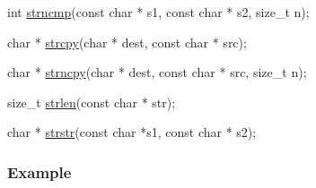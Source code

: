 \begin{DoxyCode}
\textcolor{keywordtype}{int} \mbox{\hyperlink{a00128_a07f4a84c11c106e95c32b6ab509346ef}{strncmp}}(\textcolor{keyword}{const} \textcolor{keywordtype}{char} * s1, \textcolor{keyword}{const} \textcolor{keywordtype}{char} * s2, \textcolor{keywordtype}{size\_t} n);

\textcolor{keywordtype}{char} * \mbox{\hyperlink{a00128_a7a82515b5d377be04817715c5465b647}{strcpy}}(\textcolor{keywordtype}{char} * dest, \textcolor{keyword}{const} \textcolor{keywordtype}{char} * src);

\textcolor{keywordtype}{char} * \mbox{\hyperlink{a00128_a47d54f24198df56da51078a6c540b9ed}{strncpy}}(\textcolor{keywordtype}{char} * dest, \textcolor{keyword}{const} \textcolor{keywordtype}{char} * src, \textcolor{keywordtype}{size\_t} n);

\textcolor{keywordtype}{size\_t} \mbox{\hyperlink{a00128_a008e171a518fe0e0352f31b245e03875}{strlen}}(\textcolor{keyword}{const} \textcolor{keywordtype}{char} * str);

\textcolor{keywordtype}{char} * \mbox{\hyperlink{a00128_aeb923ee2a7a01f82eb1e2f8ae188c6d4}{strstr}}(\textcolor{keyword}{const} \textcolor{keywordtype}{char} *s1, \textcolor{keyword}{const} \textcolor{keywordtype}{char} * s2);
\end{DoxyCode}


\subsubsection*{Example}


 